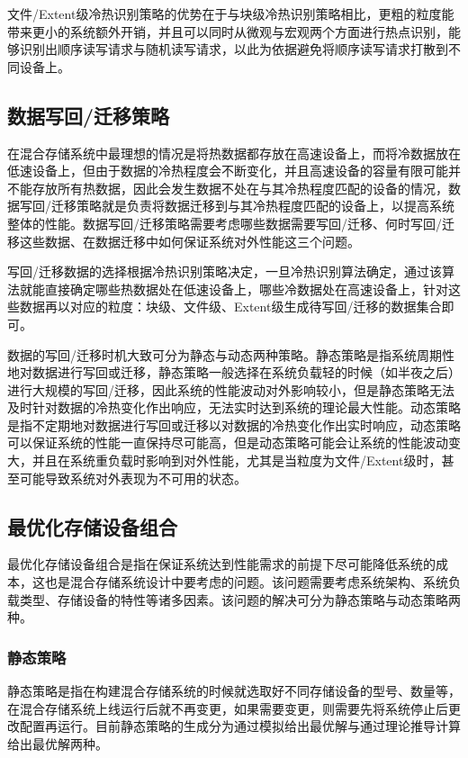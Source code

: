 文件/Extent级冷热识别策略的优势在于与块级冷热识别策略相比，更粗的粒度能带来更小的系统额外开销，并且可以同时从微观与宏观两个方面进行热点识别，能够识别出顺序读写请求与随机读写请求，以此为依据避免将顺序读写请求打散到不同设备上。

\subsection{数据写回/迁移策略}

在混合存储系统中最理想的情况是将热数据都存放在高速设备上，而将冷数据放在低速设备上，但由于数据的冷热程度会不断变化，并且高速设备的容量有限可能并不能存放所有热数据，因此会发生数据不处在与其冷热程度匹配的设备的情况，数据写回/迁移策略就是负责将数据迁移到与其冷热程度匹配的设备上，以提高系统整体的性能。数据写回/迁移策略需要考虑哪些数据需要写回/迁移、何时写回/迁移这些数据、在数据迁移中如何保证系统对外性能这三个问题。

写回/迁移数据的选择根据冷热识别策略决定，一旦冷热识别算法确定，通过该算法就能直接确定哪些热数据处在低速设备上，哪些冷数据处在高速设备上，针对这些数据再以对应的粒度：块级、文件级、Extent级生成待写回/迁移的数据集合即可。

数据的写回/迁移时机大致可分为静态与动态两种策略。静态策略是指系统周期性地对数据进行写回或迁移，静态策略一般选择在系统负载轻的时候（如半夜之后）进行大规模的写回/迁移，因此系统的性能波动对外影响较小，但是静态策略无法及时针对数据的冷热变化作出响应，无法实时达到系统的理论最大性能。动态策略是指不定期地对数据进行写回或迁移以对数据的冷热变化作出实时响应，动态策略可以保证系统的性能一直保持尽可能高，但是动态策略可能会让系统的性能波动变大，并且在系统重负载时影响到对外性能，尤其是当粒度为文件/Extent级时，甚至可能导致系统对外表现为不可用的状态。

\subsection{最优化存储设备组合}

最优化存储设备组合是指在保证系统达到性能需求的前提下尽可能降低系统的成本，这也是混合存储系统设计中要考虑的问题。该问题需要考虑系统架构、系统负载类型、存储设备的特性等诸多因素。该问题的解决可分为静态策略与动态策略两种。

\subsubsection{静态策略}

静态策略是指在构建混合存储系统的时候就选取好不同存储设备的型号、数量等，在混合存储系统上线运行后就不再变更，如果需要变更，则需要先将系统停止后更改配置再运行。目前静态策略的生成分为通过模拟\cite{guerra2011cost}给出最优解与通过理论推导计算\cite{kim2011hybridstore}给出最优解两种。

